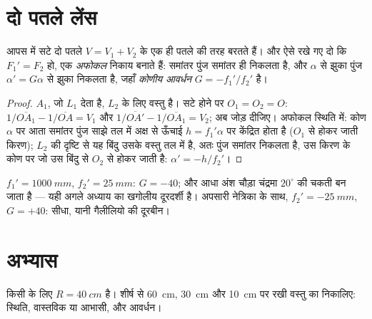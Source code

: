 \section{दो पतले लेंस}

\begin{proposition}[सटे हुए लेंस; अफोकल युग्म]\label{prop:b1:mirrors-thin-lenses:doublet}
आपस में सटे दो पतले   $V = V_1 + V_2$ के एक ही पतले  की तरह
बरतते हैं। और ऐसे रखे गए दो  कि $F_1' = F_2$ हो, एक
\emph{अफोकल} निकाय बनाते हैं: समांतर पुंज समांतर ही निकलता है, और $\alpha$
से झुका पुंज $\alpha' = G\alpha$ से झुका निकलता है, जहाँ
\emph{कोणीय आवर्धन} $G = -f_1'/f_2'$ है।
\end{proposition}

\begin{proof}
 $A_1$, जो $L_1$ देता है, $L_2$ के लिए वस्तु है। सटे होने पर
$O_1 = O_2 = O$: $1/\overline{OA_1} - 1/\overline{OA} = V_1$ और
$1/\overline{OA'} - 1/\overline{OA_1} = V_2$; अब जोड़ दीजिए। अफोकल स्थिति में:
कोण $\alpha$ पर आता समांतर पुंज साझे  तल में अक्ष से ऊँचाई
$h = f_1'\alpha$ पर केंद्रित होता है ($O_1$ से होकर जाती किरण); $L_2$ की
दृष्टि से यह बिंदु उसके वस्तु  तल में है, अतः पुंज समांतर निकलता है, उस
किरण के कोण पर जो उस बिंदु से $O_2$ से होकर जाती है: $\alpha' = -h/f_2'$।
\end{proof}

\begin{example}[एक पंक्ति में दूरदर्शी]\label{ex:b1:mirrors-thin-lenses:afocal}
$f_1' = \qty{1000}{mm}$, $f_2' = \qty{25}{mm}$: $G = -40$; और आधा अंश चौड़ा
चंद्रमा $20^\circ$ की चकती बन जाता है --- यही अगले अध्याय का खगोलीय
दूरदर्शी है। अपसारी नेत्रिका के साथ,
$f_2' = \qty{-25}{mm}$, $G = +40$: सीधा, यानी गैलीलियो की दूरबीन।
\end{example}

\section{अभ्यास}

\begin{exercise}[$\star$]\label{exo:b1:mirrors-thin-lenses:1}
किसी  के लिए $R = \qty{40}{cm}$ है। शीर्ष से \qty{60}{cm},
\qty{30}{cm} और \qty{10}{cm} पर रखी वस्तु का  निकालिए:
स्थिति, वास्तविक या आभासी, और आवर्धन।
\end{exercise}

